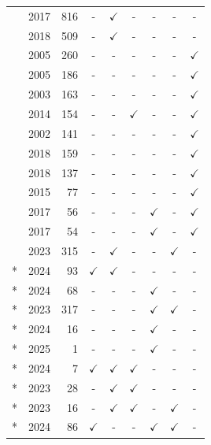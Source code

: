 \begin{table}[t]
\begin{minipage}{0.59\textwidth}
\begin{tabular}{llrcccccc}
\cite{doran2017does} & 2017 & 816 & - & $\checkmark$ & - & - & - & - \\
\cite{goebel2018explainable} & 2018 & 509 & - & $\checkmark$ & - & - & - & - \\
\cite{gervasi2005reasoning} & 2005 & 260 & - & - & - & - & - & $\checkmark$ \\
\cite{dahlstedt2005requirements} & 2005 & 186 & - & - & - & - & - & $\checkmark$ \\
\cite{damian2003insight} & 2003 & 163 & - & - & - & - & - & $\checkmark$ \\
\cite{shao2014integrating} & 2014 & 154 & - & - & $\checkmark$ & - & - & $\checkmark$ \\
\cite{alves2002challenges} & 2002 & 141 & - & - & - & - & - & $\checkmark$ \\
\cite{hujainah2018software} & 2018 & 159 & - & - & - & - & - & $\checkmark$ \\
\cite{hudaib2018requirements} & 2018 & 137 & - & - & - & - & - & $\checkmark$ \\
\cite{riegel2015systematic} & 2015 & 77 & - & - & - & - & - & $\checkmark$ \\
\cite{sadiq2017fuzzy} & 2017 & 56 & - & - & - & $\checkmark$ & - & $\checkmark$ \\
\cite{morales2017exploiting} & 2017 & 54 & - & - & - & $\checkmark$ & - & $\checkmark$ \\
\cite{hoffman2023measures} & 2023 & 315 & - & $\checkmark$ & - & - & $\checkmark$ & - \\
\cite{mavrepis2024xai}* & 2024 & 93 & $\checkmark$ & $\checkmark$ & - & - & - & - \\
\cite{kim2024stakeholder}* & 2024 & 68 & - & - & - & $\checkmark$ & - & - \\
\cite{haque2023explainable}* & 2023 & 317 & - & - & - & $\checkmark$ & $\checkmark$ & - \\
\cite{mill2024sage}* & 2024 & 16 & - & - & - & $\checkmark$ & - & - \\
\cite{dhar2025beyond}* & 2025 & 1 & - & - & - & $\checkmark$ & - & - \\
\cite{serafim2024exploring}* & 2024 & 7 & $\checkmark$ & $\checkmark$ & $\checkmark$ & - & - & - \\
\cite{ziems2023explaining}* & 2023 & 28 & - & $\checkmark$ & $\checkmark$ & - & - & - \\
\cite{sivaprasad2023evaluation}* & 2023 & 16 & - & $\checkmark$ & $\checkmark$ & - & $\checkmark$ & - \\
\cite{schuller2024generating}* & 2024 & 86 & $\checkmark$ & - & - & $\checkmark$ & $\checkmark$ & - \\

\end{tabular}
\end{minipage}
\end{table}
